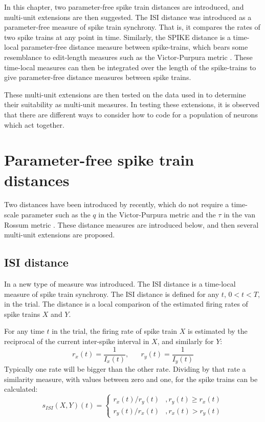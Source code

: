 In this chapter, two parameter-free spike train distances are introduced, and multi-unit extensions are then suggested.  The ISI distance \citep{KreuzEtAl2007a} was introduced as a parameter-free measure of spike train synchrony. That is, it compares the rates of two spike trains at any point in time. Similarly, the SPIKE distance \citep{KreuzEtAl2012a} is a time-local parameter-free distance measure between spike-trains, which bears some resemblance to edit-length measures such as the Victor-Purpura metric \citep{VictorPurpura1997a}.  These time-local measures can then be integrated over the length of the spike-trains to give parameter-free distance measures between spike trains. 

These multi-unit extensions are then tested on the data used in \citep{HoughtonSen2008a} to determine their suitability as multi-unit measures.  In testing these extensions, it is observed that there are different ways to consider how to code for a population of neurons which act together.


\section{Parameter-free spike train distances}
Two distances have been introduced by \citet{KreuzEtAl2007a,KreuzEtAl2012a} recently, which do not require a time-scale parameter such as the $q$ in the Victor-Purpura metric \citep{VictorPurpura1997a} and the $\tau$ in the van Rossum metric \citep{VanRossum2001a}.  These distance measures are introduced below, and then several multi-unit extensions are proposed.


\subsection{ISI distance}
In \citep{KreuzEtAl2007a} a new type of measure was introduced.  The ISI distance is a time-local measure of spike train synchrony.  The ISI distance is defined for any $t$, $0<t<T$, in the trial.  The distance is a local comparison of the estimated firing rates of spike trains $X$ and $Y$.  

For any time $t$ in the trial, the firing rate of spike train $X$ is estimated by the reciprocal of the current inter-spike interval in $X$, and similarly for $Y$:
\begin{equation}
r_x(t) = \frac{1}{I_x(t)}, \hspace{20pt} r_y(t) = \frac{1}{I_y(t)}
\end{equation}
Typically one rate will be bigger than the other rate. Dividing by that rate a similarity measure, with values between zero and one, for the spike trains can be calculated:
\begin{equation}
s_{ISI}(X,Y)(t) = \left\{ \begin{array}{ll} r_x(t)/r_y(t) & ,r_y(t) \geq r_x(t)\\ r_y(t)/r_x(t) & , r_x(t) > r_y(t) \end{array}\right.
\end{equation}

